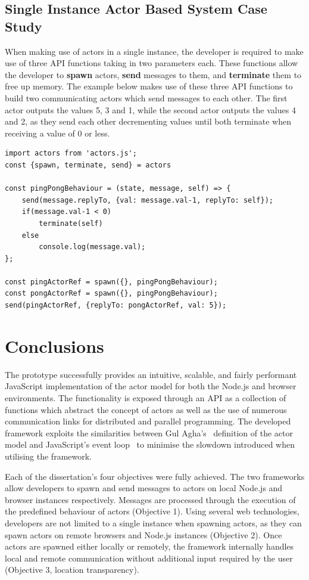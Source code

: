 \documentclass[lettersize,journal]{IEEEtran}
\begin{document}
\subsection{Single Instance Actor Based System Case Study}
When making use of actors in a single instance, the developer is required to make use of three API functions taking in two parameters each. These functions allow the developer to \textbf{spawn} actors, \textbf{send} messages to them, and \textbf{terminate} them to free up memory. The example below makes use of these three API functions to build two communicating actors which send messages to each other. The first actor outputs the values 5, 3 and 1, while the second actor outputs the values 4 and 2, as they send each other decrementing values until both terminate when receiving a value of 0 or less.
\begin{lstlisting}    
import actors from 'actors.js';
const {spawn, terminate, send} = actors

const pingPongBehaviour = (state, message, self) => {
    send(message.replyTo, {val: message.val-1, replyTo: self});
    if(message.val-1 < 0)
        terminate(self)
    else    
        console.log(message.val);
};

const pingActorRef = spawn({}, pingPongBehaviour);
const pongActorRef = spawn({}, pingPongBehaviour);
send(pingActorRef, {replyTo: pongActorRef, val: 5});
\end{lstlisting}
\section{Conclusions}
The prototype successfully provides an intuitive, scalable, and fairly performant JavaScript implementation of the actor model for both the Node.js and browser environments. The functionality is exposed through an API as a collection of functions which abstract the concept of actors as well as the use of numerous communication links for distributed and parallel programming. The developed framework exploits the similarities between Gul Agha's~\cite{agha1985actors} definition of the actor model and JavaScript's event loop~\cite{eventloopbrowser, eventloopnode} to minimise the slowdown introduced when utilising the framework. 

Each of the dissertation's four objectives were fully achieved. The two frameworks allow developers to spawn and send messages to actors on local Node.js and browser instances respectively. Messages are processed through the execution of the predefined behaviour of actors (Objective 1). Using several web technologies, developers are not limited to a single instance when spawning actors, as they can spawn actors on remote browsers and Node.js instances (Objective 2). Once actors are spawned either locally or remotely, the framework internally handles local and remote communication without additional input required by the user (Objective 3, location transparency).
\end{document}
